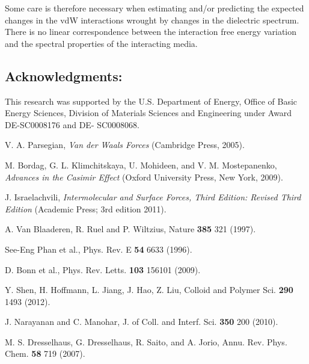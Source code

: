 \documentclass[letterpaper,twocolumn,amsmath,amssymb,floatfix,aps,superscriptaddress]{revtex4}
\begin{document}
Some care is therefore necessary when estimating and/or predicting the expected changes in the vdW interactions wrought by changes in the dielectric spectrum. There is no linear correspondence between the interaction free energy variation and the spectral properties of the interacting media.

\subsection{Acknowledgments:}

This research was supported by the U.S. Department of Energy, Office of Basic Energy Sciences, Division of Materials Sciences and Engineering under Award DE-SC0008176 and DE- SC0008068.

\begin{thebibliography}{99}

 V. A. Parsegian, \textsl{Van der Waals Forces} (Cambridge Press, 2005).

 M. Bordag, G. L. Klimchitskaya, U. Mohideen, and V. M. Mostepanenko,
{\em Advances in the Casimir Effect} (Oxford University Press, New York, 2009).

 J. Israelachvili, {\sl Intermolecular and Surface Forces, Third Edition: Revised Third Edition}  (Academic Press; 3rd edition 2011).

 A. Van Blaaderen, R. Ruel and P. Wiltzius, %
Nature {\bf 385} 321 (1997).

 See-Eng Phan et al., %
Phys. Rev. E {\bf 54} 6633 (1996).

 D. Bonn et al., %
Phys. Rev. Letts. {\bf 103} 156101 (2009).

 Y. Shen, H. Hoffmann, L. Jiang, J. Hao, Z. Liu, %
Colloid and Polymer Sci. {\bf 290} 1493 (2012).

 J. Narayanan and C. Manohar, %
J. of Coll. and Interf. Sci. {\bf 350} 200 (2010).

 M. S. Dresselhaus, G. Dresselhaus, R. Saito, and A. Jorio, Annu. Rev. Phys. Chem. {\bf 58} 719 (2007).


\end{thebibliography}
\end{document}

